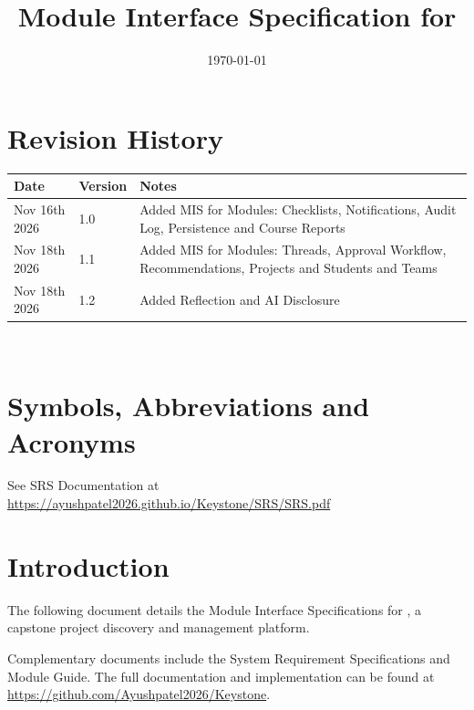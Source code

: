 \documentclass[12pt, titlepage]{article}
\begin{document}
\title{Module Interface Specification for \projname{}}

\author{\authname}

\date{\today}

\maketitle


\section{Revision History}

\begin{tabularx}{\textwidth}{p{3cm}p{2cm}X}
\toprule {\bf Date} & {\bf Version} & {\bf Notes}\\
\midrule
Nov 16th 2026 & 1.0 & Added MIS for Modules: Checklists, Notifications, Audit Log, Persistence and Course Reports\\
Nov 18th 2026 & 1.1 & Added MIS for Modules: Threads, Approval Workflow, Recommendations, Projects and Students and Teams\\
Nov 18th 2026 & 1.2 & Added Reflection and AI Disclosure\\
\bottomrule
\end{tabularx}

~\newpage

\section{Symbols, Abbreviations and Acronyms}

See SRS Documentation at \url{https://ayushpatel2026.github.io/Keystone/SRS/SRS.pdf}


\newpage

\tableofcontents

\newpage


\section{Introduction}

The following document details the Module Interface Specifications for \projname{},
a capstone project discovery and management platform.

Complementary documents include the System Requirement Specifications
and Module Guide.  The full documentation and implementation can be
found at \url{https://github.com/Ayushpatel2026/Keystone}.
\end{document}
